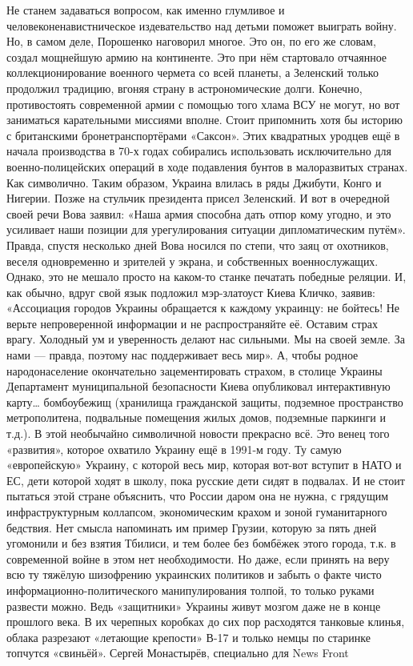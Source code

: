Не станем задаваться вопросом, как именно глумливое и человеконенавистническое  издевательство над детьми поможет выиграть войну. Но, в самом деле, Порошенко наговорил многое. Это он, по его же словам, создал мощнейшую армию на континенте. Это при нём стартовало отчаянное коллекционирование военного чермета со всей планеты, а Зеленский только продолжил традицию, вгоняя страну в астрономические долги.
Конечно, противостоять современной армии с помощью того хлама ВСУ не могут, но вот заниматься карательными миссиями вполне. Стоит припомнить хотя бы историю с британскими бронетранспортёрами «Саксон». Этих квадратных уродцев ещё в начала производства в 70-х годах собирались использовать исключительно для военно-полицейских операций в ходе подавления бунтов в малоразвитых странах. Как символично. Таким образом, Украина влилась в ряды Джибути, Конго и Нигерии.
Позже на стульчик президента присел Зеленский. И вот в очередной своей речи Вова заявил:
«Наша армия способна дать отпор кому угодно, и это усиливает наши позиции для урегулирования ситуации дипломатическим путём».
Правда, спустя несколько дней Вова носился по степи, что заяц от охотников, веселя одновременно и зрителей у экрана, и собственных военнослужащих. Однако, это не мешало просто на каком-то станке печатать победные реляции.
И, как обычно, вдруг свой язык подложил мэр-златоуст Киева Кличко, заявив:
«Ассоциация городов Украины обращается к каждому украинцу: не бойтесь! Не верьте непроверенной информации и не распространяйте её. Оставим страх врагу. Холодный ум и уверенность делают нас сильными. Мы на своей земле. За нами — правда, поэтому нас поддерживает весь мир».
А, чтобы родное народонаселение окончательно зацементировать страхом, в столице Украины Департамент муниципальной безопасности Киева опубликовал интерактивную карту… бомбоубежищ (хранилища гражданской защиты, подземное пространство метрополитена, подвальные помещения жилых домов, подземные паркинги и т.д.). В этой необычайно символичной новости прекрасно всё.
Это венец того «развития», которое охватило Украину ещё в 1991-м году. Ту самую «европейскую» Украину, с которой весь мир, которая вот-вот вступит в НАТО и ЕС, дети которой ходят в школу, пока русские дети сидят в подвалах. И не стоит пытаться этой стране объяснить, что России даром она не нужна, с грядущим инфраструктурным коллапсом, экономическим крахом и зоной гуманитарного бедствия. Нет смысла напоминать им пример Грузии, которую за пять дней угомонили и без взятия Тбилиси, и тем более без бомбёжек этого города, т.к. в современной войне в этом нет необходимости.
Но даже, если принять на веру всю ту тяжёлую шизофрению украинских политиков и забыть о факте чисто информационно-политического манипулирования толпой, то только руками развести можно. Ведь «защитники» Украины живут мозгом даже не в конце прошлого века. В их черепных коробках до сих пор расходятся танковые клинья, облака разрезают «летающие крепости» В-17 и только немцы по старинке топчутся «свиньёй».
Сергей Монастырёв, специально для News Front
